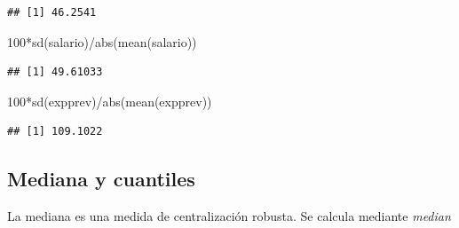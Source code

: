 \documentclass[
]{book}
\newenvironment{Shaded}{\begin{snugshade}}{\end{snugshade}}
\newcommand{\DecValTok}[1]{\textcolor[rgb]{0.00,0.00,0.81}{#1}}
\newcommand{\FunctionTok}[1]{\textcolor[rgb]{0.00,0.00,0.00}{#1}}
\newcommand{\NormalTok}[1]{#1}
\newcommand{\SpecialCharTok}[1]{\textcolor[rgb]{0.00,0.00,0.00}{#1}}
\theoremstyle{break}
\theoremstyle{nonumberplain}
\begin{document}
\begin{verbatim}
## [1] 46.2541
\end{verbatim}

\begin{Shaded}
\begin{Highlighting}[]
\DecValTok{100}\SpecialCharTok{*}\FunctionTok{sd}\NormalTok{(salario)}\SpecialCharTok{/}\FunctionTok{abs}\NormalTok{(}\FunctionTok{mean}\NormalTok{(salario))}
\end{Highlighting}
\end{Shaded}

\begin{verbatim}
## [1] 49.61033
\end{verbatim}

\begin{Shaded}
\begin{Highlighting}[]
\DecValTok{100}\SpecialCharTok{*}\FunctionTok{sd}\NormalTok{(expprev)}\SpecialCharTok{/}\FunctionTok{abs}\NormalTok{(}\FunctionTok{mean}\NormalTok{(expprev))}
\end{Highlighting}
\end{Shaded}

\begin{verbatim}
## [1] 109.1022
\end{verbatim}

\hypertarget{mediana-y-cuantiles}{%
\subsection{Mediana y cuantiles}\label{mediana-y-cuantiles}}

La mediana es una medida de centralización robusta. Se calcula mediante \emph{median}
\end{document}
